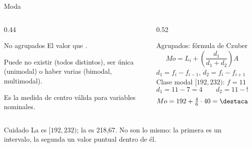 \documentclass[aspectratio=169,10pt]{beamer}
\begin{document}
\begin{frame}{Moda}
  \footnotesize
  \begin{columns}[T,onlytextwidth]
    \begin{column}{0.44\textwidth}
      \begin{block}{No agrupados}
        \scriptsize
        El valor que .

        \vspace{0.1cm}
        Puede no existir (todos distintos), ser única (unimodal) o haber
        varias (bimodal, multimodal).

        \vspace{0.1cm}
        Es la  medida de centro válida para variables
        nominales.
      \end{block}
    \end{column}
    \begin{column}{0.52\textwidth}
      \begin{exampleblock}{Agrupados: fórmula de Czuber}
        \scriptsize
        \[ Mo = L_i + \left(\frac{d_1}{d_1+d_2}\right) A \]
        $d_1 = f_i - f_{i-1}$, \quad $d_2 = f_i - f_{i+1}$
        \vspace{0.1cm}
        Clase modal $[192,232)$: $f=11$
        \[ d_1 = 11-7 = 4 \qquad d_2 = 11-9 = 2 \]
        \[ Mo = 192 + \tfrac{4}{6}\cdot 40 = \destacar{218{,}67} \]
      \end{exampleblock}
    \end{column}
  \end{columns}

  \vspace{0.1cm}
  \begin{alertblock}{Cuidado}
    \scriptsize
    La  es $[192, 232)$; la  es 218,67.
    No son lo mismo: la primera es un intervalo, la segunda un valor puntual
    dentro de él.
  \end{alertblock}
\end{frame}
\end{document}
